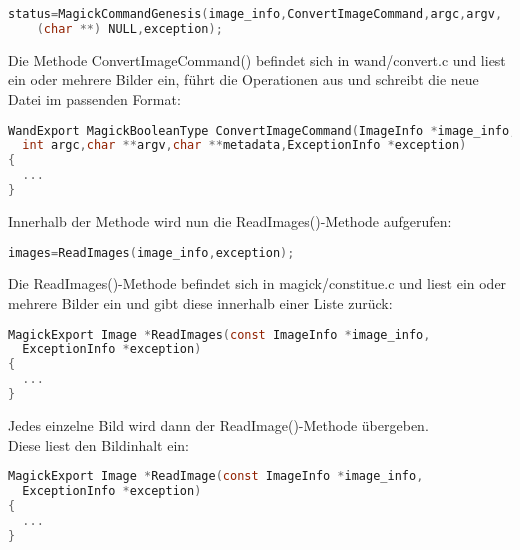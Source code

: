 \begin{lstlisting}[firstnumber=81, language=C, caption=utilities/convert.c Aufruf MagickCommandGenesis(),label={lst:lstlisting}]
  status=MagickCommandGenesis(image_info,ConvertImageCommand,argc,argv,
    (char **) NULL,exception);
\end{lstlisting}
\vspace{5mm}

Die Methode ConvertImageCommand() befindet sich in wand/convert.c und liest ein oder mehrere Bilder ein, führt die Operationen aus und schreibt die neue Datei im passenden Format:\\

\begin{lstlisting}[firstnumber=498, language=C, caption=wand/convert.c ConvertImageCommand(),label={lst:lstlisting}]
WandExport MagickBooleanType ConvertImageCommand(ImageInfo *image_info,
  int argc,char **argv,char **metadata,ExceptionInfo *exception)
{
  ...
}
\end{lstlisting}
\vspace{5mm}

Innerhalb der Methode wird nun die ReadImages()-Methode aufgerufen:\\

\begin{lstlisting}[firstnumber=628, language=C, caption=wand/convert.c Aufruf ReadImages(),label={lst:lstlisting}]
  images=ReadImages(image_info,exception);
\end{lstlisting}
\vspace{5mm}

Die ReadImages()-Methode befindet sich in magick/constitue.c und liest ein oder mehrere Bilder ein und gibt diese innerhalb einer Liste zurück:\\

\begin{lstlisting}[firstnumber=790, language=C, caption=magick/constitute.c ReadImages(),label={lst:lstlisting}]
MagickExport Image *ReadImages(const ImageInfo *image_info,
  ExceptionInfo *exception)
{
  ...
}
\end{lstlisting}
\vspace{5mm}

Jedes einzelne Bild wird dann der ReadImage()-Methode übergeben.\\
Diese liest den Bildinhalt ein:\\

\begin{lstlisting}[firstnumber=352, language=C, caption=magick/constitute.c ReadImage(),label={lst:lstlisting}]
MagickExport Image *ReadImage(const ImageInfo *image_info,
  ExceptionInfo *exception)
{
  ...
}
\end{lstlisting}
\vspace{5mm}

